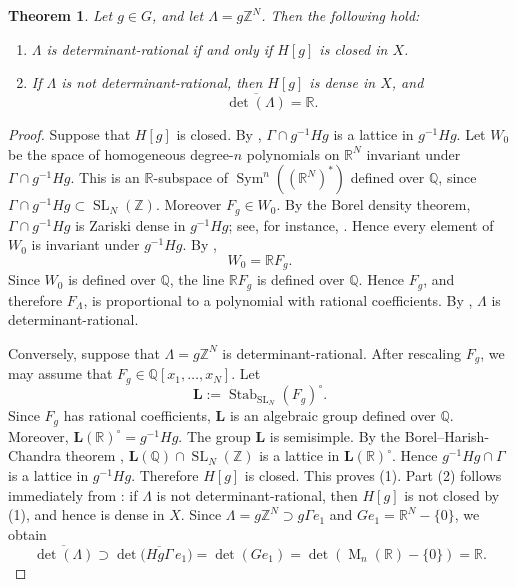 \documentclass[reqno,11pt]{amsart}
\numberwithin{equation}{section}
\newtheorem{theorem}{Theorem}[section]
\theoremstyle{definition}
\theoremstyle{remark}
\newcommand{\op}{\operatorname}
\newcommand{\M}{\op{M}}
\newcommand{\SL}{\op{SL}}
\begin{document}
\begin{theorem}
\label{prop:closed-rational-csa}
Let $g\in G$, and let
$\Lambda=g\mathbb Z^N$.
Then the following hold:
\begin{enumerate}
\item $\Lambda$ is determinant-rational if and only if $H[g]$ is closed
in $X$.
\item If $\Lambda$ is not determinant-rational, then $H[g]$ is dense in
$X$, and
$$
    \overline{\det(\Lambda)}=\mathbb R.
$$
\end{enumerate}
\end{theorem}

\begin{proof}
 Suppose
that $H[g]$ is closed. By ,
$\Gamma\cap g^{-1}Hg$
is a lattice in $g^{-1}Hg$.
Let $W_0$ be the space of homogeneous degree-$n$ polynomials on
$\mathbb R^N$ invariant under $\Gamma\cap g^{-1}Hg$. This is an
$\mathbb R$-subspace of $\operatorname{Sym}^n((\mathbb R^N)^*)$ defined over $\mathbb Q$, since
$\Gamma\cap g^{-1}Hg\subset \SL_N(\mathbb Z)$. Moreover $F_g\in W_0$.
By the Borel density theorem, $\Gamma\cap g^{-1}Hg$ is Zariski dense in
$g^{-1}Hg$; see, for instance, \cite{zimmer1984ergodic}. Hence every
element of $W_0$ is invariant under $g^{-1}Hg$. By ,
$$
    W_0=\mathbb R F_g.
$$
Since $W_0$ is defined over $\mathbb Q$, the line
$\mathbb R F_g$ is defined over $\mathbb Q$. Hence $F_g$, and
therefore $F_\Lambda$, is proportional to a polynomial with rational
coefficients. By , $\Lambda$ is
determinant-rational.

Conversely, suppose that $\Lambda=g\mathbb Z^N$ is determinant-rational.
After rescaling $F_g$, we may assume that
$ F_g\in\mathbb Q[x_1,\dots,x_N]$.
Let
$$
    \mathbf L
    :=
    \operatorname{Stab}_{\SL_N}(F_g)^\circ .
$$
Since $F_g$ has rational coefficients, $\mathbf L$ is an algebraic
group defined over $\mathbb Q$. Moreover,
$\mathbf L(\mathbb R)^\circ=g^{-1}Hg$.
The group $\mathbf L$ is semisimple. By the Borel--Harish-Chandra
theorem \cite{borel-harish:1962}, $\mathbf L(\mathbb Q)\cap \SL_N(\mathbb Z)$
is a lattice in $\mathbf L(\mathbb R)^\circ$. Hence
$ g^{-1}Hg\cap \Gamma$
is a lattice in $g^{-1}Hg$. Therefore $H[g]$ is closed.
This proves (1). 
Part (2) follows immediately from : if
$\Lambda$ is not determinant-rational, then $H[g]$ is not closed by (1), and
hence is dense in $X$. Since
$\Lambda=g\mathbb Z^N\supset g\Gamma e_1$
and $ Ge_1=\mathbb R^N-\{0\}$,
we obtain
$$
    \overline{\det(\Lambda)}
    \supset
    \det\bigl(\overline{Hg\Gamma}\,e_1\bigr)
    =
    \det(Ge_1)
    =
    \det(\M_n(\mathbb R)-\{0\})
    =
    \mathbb R.
$$
\end{proof}
\end{document}

